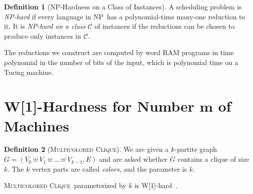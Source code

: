 \documentclass[11pt,a4paper]{article}
\theoremstyle{definition}
\newtheorem{definition}{Definition}
\newcommand{\MCC}{\textsc{Multicolored Clique}}
\newcommand{\Wone}{\textnormal{\textsf{W[1]}}}
\newcommand{\NP}{\textnormal{\textsf{NP}}}
\begin{document}
\begin{definition}[\NP-Hardness on a Class of Instances]
A scheduling problem is \emph{\NP-hard} if every language in \NP\ has a polynomial-time
many-one reduction to it. It is \emph{\NP-hard on a class} $\mathcal{C}$ of instances if
the reductions can be chosen to produce only instances in $\mathcal{C}$.
\end{definition}
The reductions we construct are computed by word RAM programs in time polynomial in the
number of bits of the input, which is polynomial time on a Turing machine.

\section{\textsf{W[1]}-Hardness for Number \texorpdfstring{$\boldsymbol{m}$}{m} of Machines}\label{sec:1}

\begin{definition}[\MCC]
We are given a $k$-partite graph $G=(V_0\uplus V_1\uplus\ldots\uplus V_{k-1},E)$ and are
asked whether $G$ contains a clique of size $k$. The $k$ vertex parts are called
\emph{colors}, and the parameter is $k$.
\end{definition}
\MCC\ parameterized by $k$ is \Wone-hard~\cite{FHRV09}.
\end{document}
